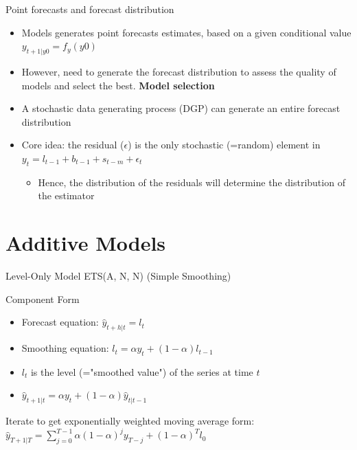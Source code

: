 \documentclass{beamer}
\begin{document}
\begin{frame}{Point forecasts and forecast distribution}

  \begin{itemize}
  \item Models generates point forecasts estimates, based on a given conditional value $y_{t+1|y0} = f_y(y0)$ 
  \item However, need to generate the forecast distribution to assess the quality of models and select the best. \textbf{Model selection}
  \item A stochastic data generating process (DGP) can generate an entire forecast distribution
  \item Core idea: the residual ($\epsilon$) is the only stochastic (=random) element in $y_t = l_{t-1} + b_{t-1} + s_{t-m} + \epsilon_t$
    \begin{itemize}
    \item Hence, the distribution of the residuals will determine the distribution of the estimator
    \end{itemize}
  \end{itemize}


  
\end{frame}

\section{Additive Models}
\begin{frame}{Level-Only Model ETS(A, N, N) (Simple Smoothing)}
  \begin{block}{Component Form}
    \begin{itemize}
    \item Forecast equation: $\hat{y}_{t+h |t} = l_t$
    \item Smoothing equation: $l_t = \alpha y_t + (1-\alpha)l_{t-1}$
    \end{itemize}
  \end{block}

  \begin{itemize}
  \item $l_t$ is the level (="smoothed value") of the series at time $t$
  \item $\hat{y}_{t+1|t} = \alpha y_t + (1 - \alpha)\hat{y}_{t|t-1}$
  \end{itemize}
  Iterate to get exponentially weighted moving average form: $\hat{y}_{T+1|T} = \sum_{j=0}^{T-1}\alpha(1-\alpha)^j y_{T-j} + (1-\alpha)^Tl_0$  
\end{frame}
\end{document}
